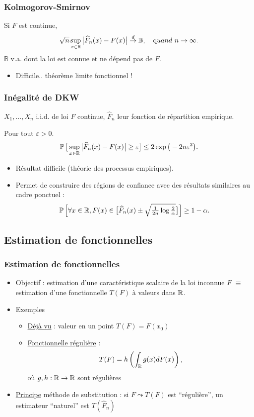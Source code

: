 \begin{frame}
\frametitle{Kolmogorov-Smirnov}
\begin{theo} 
Si $F$ est continue, $$\sqrt{n}\sup_{x \in \operatorname{{\mathbb R}}}\big|\widehat F_n(x)-F(x)\big|
\stackrel{d}{\rightarrow} \mathbb{B}, \quad {\text quand} \ n\to
\infty.$$
$\mathbb{B}$ v.a. dont la loi est connue et \alert{
ne dépend pas} de $F$.
\end{theo}
\begin{itemize}
\item \alert{Difficile}.. théorème limite \alert{fonctionnel} !
\end{itemize}
\end{frame}

\begin{frame}
\frametitle{Inégalité de DKW}
$X_1,\ldots, X_n$ i.i.d. de loi $F$ \alert{continue}, $\widehat F_n$ leur fonction de répartition empirique.
\begin{prop} Pour tout $\varepsilon >0$.
$$\operatorname{{\mathbb P}}\big[\sup_{x \in \operatorname{{\mathbb R}}}\big|\widehat F_n(x)-F(x)\big|\geq \varepsilon\big] \leq 2 \exp\big(-2n\varepsilon^2\big).$$
\end{prop}
\begin{itemize}
\item Résultat difficile (théorie des processus empiriques).
\item Permet de construire des \alert{régions} de confiance avec des résultats similaires au cadre ponctuel :
$$\operatorname{{\mathbb P}}\Big[\forall x \in \operatorname{{\mathbb R}}, F(x)\in \big[\widehat F_n(x)\pm\sqrt{\tfrac{1}{2n}\log \tfrac{2}{\alpha}}\big]\Big]\geq 1-\alpha.$$
\end{itemize}
\end{frame}
\subsection{Estimation de fonctionnelles}
\begin{frame}
\frametitle{Estimation de fonctionnelles}
\begin{itemize}
\item \alert{Objectif :} estimation d'une caractéristique
scalaire de la loi inconnue $F$ $\equiv$ estimation d'une
fonctionnelle $T(F)$ à valeurs dans $\operatorname{{\mathbb R}}$.
\item Exemples
\begin{itemize}
\item \underline{Déjà vu} : valeur en un point  $T(F) = F(x_0)$
\item \underline{Fonctionnelle régulière} :
$$T(F) = h\left(\int_{\operatorname{{\mathbb R}}}g(x)dF(x)\right),$$
où $g,h: \operatorname{{\mathbb R}} \rightarrow \operatorname{{\mathbb R}}$ sont \alert{régulières}
\end{itemize}
\item \underline{Principe} \alert{méthode de substitution} : si $F \leadsto T(F)$ est
``régulière'', un estimateur ``naturel'' est $T(\widehat{F}_n)$

\end{itemize}
\end{frame}

